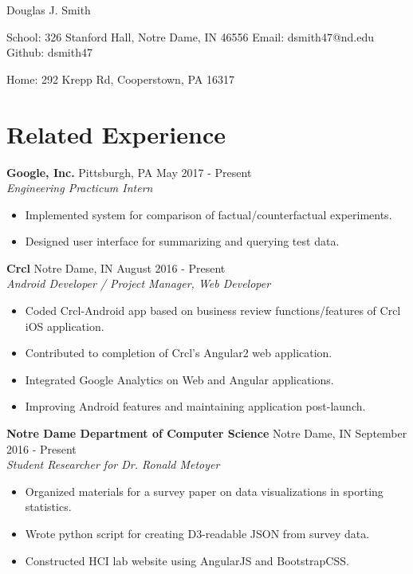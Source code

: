 \documentclass[10pt]{article}
\begin{document}
  \centerline{
    Douglas J. Smith
  }
  \centerline{
    School: 326 Stanford Hall, Notre Dame, IN 46556
    Email: dsmith47@nd.edu
    Github: dsmith47
  }
  \centerline{
    Home: 292 Krepp Rd, Cooperstown, PA 16317
  }

  \section*{Related Experience}
    \textbf{Google, Inc.}
    \hfill
    Pittsburgh, PA
    \hfill
    May 2017 - Present
    \\
    \textit{Engineering Practicum Intern}
    \begin{itemize}
      \item Implemented system for comparison of factual/counterfactual experiments.
      \item Designed user interface for summarizing and querying test data. 
    \end{itemize}
  
    \textbf{Crcl}
    \hfill
    Notre Dame, IN
    \hfill
    August 2016 - Present
    \\
    \textit{Android Developer / Project Manager, Web Developer}
    \begin{itemize}
      \item Coded Crcl-Android app based on business review functions/features of Crcl iOS application.
      \item Contributed to completion of Crcl's Angular2 web application.
      \item Integrated Google Analytics on Web and Angular applications.
      \item Improving Android features and maintaining application post-launch.
    \end{itemize}
    
    \textbf{Notre Dame Department of Computer Science}
    \hfill
    Notre Dame, IN
    \hfill
    September 2016 - Present
    \\
    \textit{Student Researcher for Dr. Ronald Metoyer}
    \begin{itemize}
      \item Organized materials for a survey paper on data visualizations in sporting statistics.
      \item Wrote python script for creating D3-readable JSON from survey data.
      \item Constructed HCI lab website using AngularJS and BootstrapCSS.
    \end{itemize}
    
\end{document}
